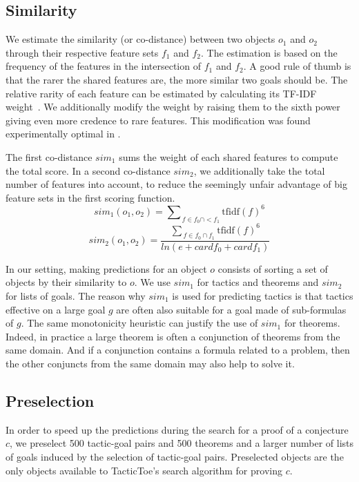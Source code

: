 \documentclass[runningheads,a4paper,draft]{svjour3}
\def\tactictoe{\textsf{TacticToe}\xspace}
\begin{document}
\subsection{Similarity}\label{sec:predictions}
We estimate the similarity (or co-distance) between two objects $o_1$ and $o_2$
through their respective feature sets $f_1$ and $f_2$.
The estimation is based on the frequency of the features in the intersection of
$f_1$ and $f_2$. A good rule of thumb is that the rarer the shared features
are, the more similar two goals should be. The relative rarity of each feature
can be estimated by calculating its TF-IDF weight~\cite{Jones72astatistical}.
We additionally modify the weight by raising them to the sixth power giving
even more credence
to rare features. This modification was found experimentally optimal in
\cite{ckju-pxtp13}.

The first co-distance $sim_1$ sums the weight of each shared
features to compute the total score.
In a second co-distance $sim_2$, we additionally take
the total number of features into account, to reduce the seemingly unfair
advantage of big
feature sets in the first scoring function.
\[sim_1 (o_1, o_2) = {\sum\nolimits_{\,f \in f_0 \cap
<f_1}{\text{tfidf}(f)^{6}}}\]
\[sim_2 (o_1, o_2) = \frac{{\sum\nolimits_{\,f \in f_0 \cap
f_1}{\text{tfidf}(f)^{6}}}}
{ln (e + \mathit{card} f_0 + \mathit{card} f_1)}\]

In our setting, making predictions for an object $o$ consists of sorting a set
of objects by their similarity to $o$. We use $sim_1$ for tactics and theorems
and $sim_2$ for lists of goals. The reason why $sim_1$ is used for
predicting tactics is that tactics effective on a large goal $g$ are often also
suitable for a goal made of sub-formulas of $g$. The same monotonicity
heuristic can justify the use of $sim_1$ for theorems. Indeed, in practice a
large theorem is often a conjunction of theorems from the same domain.
And if a conjunction contains a formula related to a problem, then the other
conjuncts from the same domain may also help to solve it.

\subsection{Preselection}\label{sec:dependencies}

In order to speed up the predictions during the search for a proof of a
conjecture $c$, we preselect 500 tactic-goal pairs and 500 theorems and a
larger number of lists of goals induced by the selection of tactic-goal pairs.
Preselected objects are the only objects available to \tactictoe's search
algorithm for proving $c$.
\end{document}
